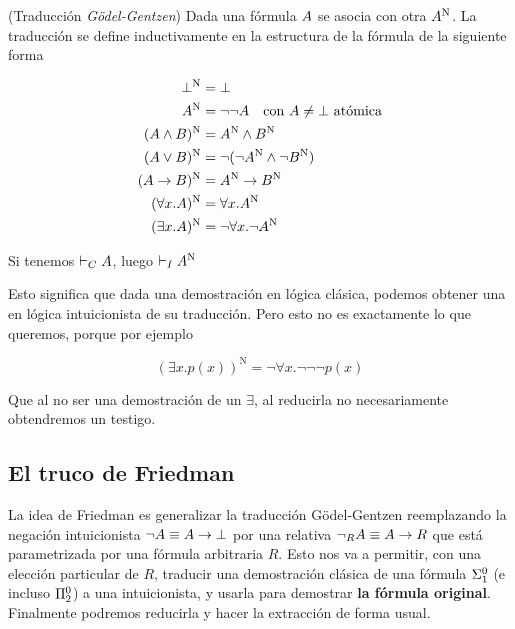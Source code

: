 \newcommand{\gN}[1]{#1^{\text{N}}}

\begin{definition}{(Traducción \textit{Gödel-Gentzen})} Dada una fórmula $A$ se asocia con otra $\gN{\form}$. La
    traducción se define inductivamente en la estructura de la fórmula de la
    siguiente forma

    \begin{align*}
        \gN{\bot} &= \bot\\
        \gN{\form} &= \neg\neg \form \quad \text{con $\form \neq \bot$ atómica}\\
        \gN{(\form \wedge \formTwo)} &= \gN{\form} \wedge \gN{\formTwo}\\
        \gN{(\form \vee \formTwo)} &= \neg(\neg\gN{\form} \wedge \neg\gN{\formTwo})\\
        \gN{(\form \rightarrow \formTwo)} &= \gN{\form} \rightarrow \gN{\formTwo}\\
        \gN{(\forall \var . \form)} &= \forall \var . \gN{\form}\\
        \gN{(\exists \var . \form)} &= \neg \forall \var . \neg \gN{\form}
    \end{align*}
\end{definition}

\begin{theorem}
    Si tenemos $\vdash_C A$, luego $\judgI \gN{\form}$
\end{theorem}

Esto significa que dada una demostración en lógica clásica, podemos obtener una
en lógica intuicionista de su traducción. Pero esto no es exactamente lo que
queremos, porque por ejemplo

\[
    \gN{(\exists x. p(x))} = \neg \forall x . \neg\neg\neg p(x)
\]

Que al no ser una demostración de un $\exists$, al reducirla no necesariamente
obtendremos un testigo.

\subsection{El truco de Friedman}

La idea de Friedman \cite{miquel-friedman} es generalizar la traducción
Gödel-Gentzen reemplazando la negación intuicionista $\neg A \equiv A
\rightarrow \bot$ por una relativa $\neg_R A \equiv A \rightarrow R$ que
está parametrizada por una fórmula arbitraria $R$. Esto nos va a permitir, con
una elección particular de $R$,
traducir una demostración clásica de una fórmula $\Sigma^0_1$ (e incluso
$\Pi^0_2$) a una intuicionista, y usarla para demostrar \textbf{la fórmula
original}. Finalmente podremos reducirla y hacer la extracción de forma usual.

